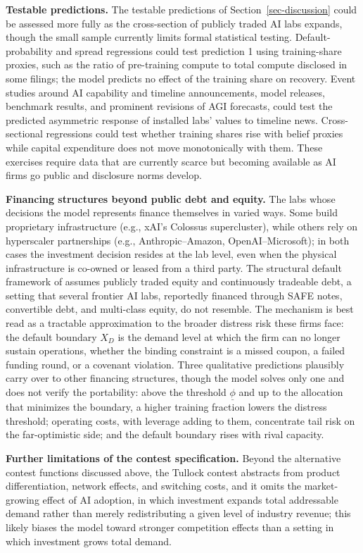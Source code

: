 \documentclass[
  11pt,
  letterpaper,
]{scrartcl}
\begin{document}
\textbf{Testable predictions.} The testable predictions of
Section~\ref{sec-discussion} could be assessed more fully as the
cross-section of publicly traded AI labs expands, though the small
sample currently limits formal statistical testing. Default-probability
and spread regressions could test prediction 1 using training-share
proxies, such as the ratio of pre-training compute to total compute
disclosed in some filings; the model predicts no effect of the training
share on recovery. Event studies around AI capability and timeline
announcements, model releases, benchmark results, and prominent
revisions of AGI forecasts, could test the predicted asymmetric response
of installed labs' values to timeline news. Cross-sectional regressions
could test whether training shares rise with belief proxies while
capital expenditure does not move monotonically with them. These
exercises require data that are currently scarce but becoming available
as AI firms go public and disclosure norms develop.

\textbf{Financing structures beyond public debt and equity.} The labs
whose decisions the model represents finance themselves in varied ways.
Some build proprietary infrastructure (e.g., xAI's Colossus
supercluster), while others rely on hyperscaler partnerships (e.g.,
Anthropic--Amazon, OpenAI--Microsoft); in both cases the investment
decision resides at the lab level, even when the physical infrastructure
is co-owned or leased from a third party. The structural default
framework of \citet{leland1994corporate} assumes publicly traded equity
and continuously tradeable debt, a setting that several frontier AI
labs, reportedly financed through SAFE notes, convertible debt, and
multi-class equity, do not resemble. The mechanism is best read as a
tractable approximation to the broader distress risk these firms face:
the default boundary \(X_D\) is the demand level at which the firm can
no longer sustain operations, whether the binding constraint is a missed
coupon, a failed funding round, or a covenant violation. Three
qualitative predictions plausibly carry over to other financing
structures, though the model solves only one and does not verify the
portability: above the threshold \(\underline{\phi}\) and up to the
allocation that minimizes the boundary, a higher training fraction
lowers the distress threshold; operating costs, with leverage adding to
them, concentrate tail risk on the far-optimistic side; and the default
boundary rises with rival capacity.

\textbf{Further limitations of the contest specification.} Beyond the
alternative contest functions discussed above, the Tullock contest
abstracts from product differentiation, network effects, and switching
costs, and it omits the market-growing effect of AI adoption, in which
investment expands total addressable demand rather than merely
redistributing a given level of industry revenue; this likely biases the
model toward stronger competition effects than a setting in which
investment grows total demand.
\end{document}
